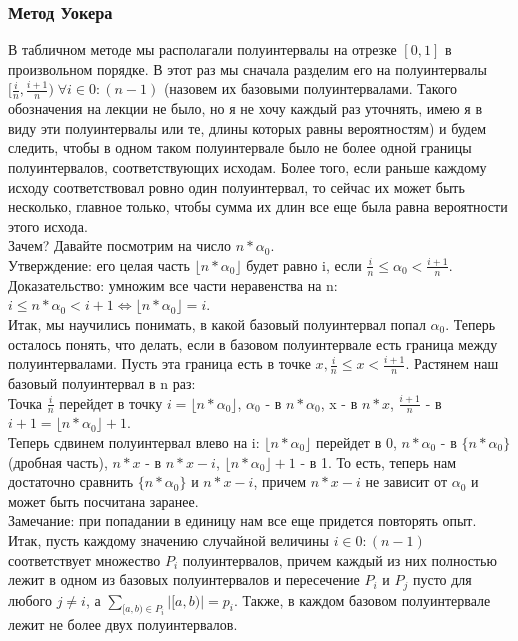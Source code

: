 \subsubsection{Метод Уокера}
В табличном методе мы располагали полуинтервалы на отрезке $[0, 1]$ в произвольном порядке. В этот раз мы сначала разделим его на полуинтервалы $[\frac{i}{n}, \frac{i + 1}{n}) \; \forall i \in 0:(n - 1)$ (назовем их базовыми полуинтервалами. Такого обозначения на лекции не было, но я не хочу каждый раз уточнять, имею я в виду эти полуинтервалы или те, длины которых равны вероятностям) и будем следить, чтобы в одном таком полуинтервале было не более одной границы полуинтервалов, соответствующих исходам. Более того, если раньше каждому исходу соответствовал ровно один полуинтервал, то сейчас их может быть несколько, главное только, чтобы сумма их длин все еще была равна вероятности этого исхода.\\
Зачем? Давайте посмотрим на число $n * \alpha_0$. \\
Утверждение: его целая часть $\lfloor n * \alpha_0 \rfloor$ будет равно i, если $\frac{i}{n} \leq \alpha_0 < \frac{i + 1}{n}$.\\
Доказательство: умножим все части неравенства на n: $i \leq n * \alpha_0 < i + 1 \Leftrightarrow \lfloor n * \alpha_0 \rfloor = i$.\\
Итак, мы научились понимать, в какой базовый полуинтервал попал $\alpha_0$. Теперь осталось понять, что делать, если в базовом полуинтервале есть граница между полуинтервалами. Пусть эта граница есть в точке $x, \frac{i}{n} \leq x < \frac{i + 1}{n}$. Растянем наш базовый полуинтервал в n раз:\\
Точка $\frac{i}{n}$ перейдет в точку $i = \lfloor n * \alpha_0 \rfloor$, $\alpha_0$ - в $n * \alpha_0$, x - в $n * x$, $\frac{i + 1}{n}$ - в $i + 1 = \lfloor n * \alpha_0 \rfloor + 1$.\\
Теперь сдвинем полуинтервал влево на i: $\lfloor n * \alpha_0 \rfloor$ перейдет в 0, $n * \alpha_0$ - в $\{n * \alpha_0\}$ (дробная часть), $n * x$ - в $n * x - i$, $\lfloor n * \alpha_0 \rfloor + 1$ - в 1. То есть, теперь нам достаточно сравнить $\{n * \alpha_0\}$ и $n * x - i$, причем $n * x - i$ не зависит от $\alpha_0$ и может быть посчитана заранее.\\
Замечание: при попадании в единицу нам все еще придется повторять опыт.\\
Итак, пусть каждому значению случайной величины $i \in 0:(n - 1)$ соответствует множество $P_i$ полуинтервалов, причем каждый из них полностью лежит в одном из базовых полуинтервалов и пересечение $P_i$ и $P_j$ пусто для любого $j \not= i$, а $\sum\limits_{[a, b) \in P_i}|[a, b)| = p_i$. Также, в каждом базовом полуинтервале лежит не более двух полуинтервалов.\\
